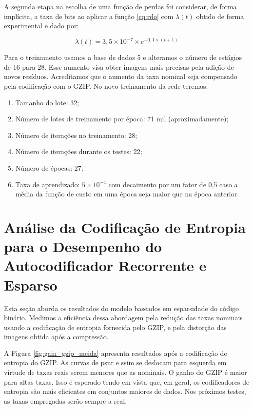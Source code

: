A segunda etapa na escolha de uma função de perdas foi considerar, de forma implícita, a taxa de bits ao aplicar a função \ref{eq:rdo} com $\lambda(t)$ obtido de forma experimental e dado por: 

\begin{equation}
\lambda(t) = 3,5 \times 10^{-7} \times e^{-0,1 \times (t+1)}  
\end{equation}

Para o treinamento usamos a base de dados 5 e alteramos o número de estágios de 16 para 28. Esse aumento visa obter imagens mais precisas pela adição de novos resíduos. Acreditamos que o aumento da taxa nominal seja compensado pela codificação com o GZIP. No novo treinamento da rede teremos:

\begin{enumerate}
	\label{enum:hiper_param2}
	\item Tamanho do lote: 32;  
	\item Número de lotes de treinamento por época: 71 mil (aproximadamente);   
	\item Número de iterações no treinamento: 28;
	\item Número de iterações durante os testes: 22;
	\item Número de épocas: 27;
	\item Taxa de aprendizado: $5 \times {10}^{-4}$ com decaimento por um fator de 0,5 caso a média da função de custo em uma época seja maior que na época anterior.
\end{enumerate}


\section{Análise da Codificação de Entropia para o Desempenho do Autocodificador Recorrente e Esparso}

Esta seção aborda os resultados do modelo baseados em esparsidade do código binário. Medimos a eficiência dessa abordagem pela redução das taxas nominais usando a codificação de entropia fornecida pelo GZIP, e pela distorção das imagens obtida após a compressão.    


A Figura \ref{fig:gain_gzip_meida} apresenta resultados após a codificação de entropia do GZIP. As curvas de \acrshort{psnr} e \acrshort{ssim} se deslocam para esquerda em virtude de taxas reais serem menores que as nominais. O ganho do GZIP é maior para altas taxas. Isso é esperado tendo em vista que, em geral, os codificadores de entropia são mais eficientes em conjuntos maiores de dados. Nos próximos testes, as taxas empregadas serão sempre a real.    

